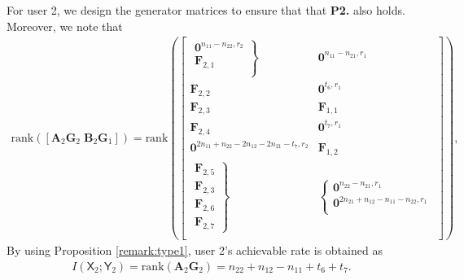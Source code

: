 \documentclass[12pt, draftclsnofoot, onecolumn]{IEEEtran}
\newcommand{\msf}[1]{\mathsf{#1}}
\theoremstyle{definition}
\begin{document}
For user 2, we design the generator matrices to ensure that that {\bf P2.} also holds. Moreover, we note that
\begin{align}
\text{rank}([\boldsymbol{A}_2\boldsymbol{G}_2 \; \boldsymbol{B}_2\boldsymbol{G}_1]) =\text{rank}\left(
\begin{bmatrix}
\left. {\begin{array}{*{20}{c}}
\boldsymbol{0}^{n_{11}-n_{22},r_2} \\
\boldsymbol{F}_{2,1} \\
\end{array}} \right\} & \boldsymbol{0}^{n_{11}-n_{21},r_1} \\
\boldsymbol{F}_{2,2} & \boldsymbol{0}^{t_6,r_1} \\
\boldsymbol{F}_{2,3} & \boldsymbol{F}_{1,1}\\
\boldsymbol{F}_{2,4} & \boldsymbol{0}^{t_7,r_1} \\
\boldsymbol{0}^{2n_{11}+n_{22}-2n_{12}-2n_{21}-t_7,r_2} & \boldsymbol{F}_{1,2} \\
\left. {\begin{array}{*{20}{c}}
\boldsymbol{F}_{2,5} \\
\boldsymbol{F}_{2,3} \\
\boldsymbol{F}_{2,6} \\
\boldsymbol{F}_{2,7}
\end{array}} \right\} & \left\{ {\begin{array}{*{20}{c}}
\boldsymbol{0}^{n_{22}-n_{21},r_1}\\
\boldsymbol{0}^{2n_{21}+n_{12}-n_{11}-n_{22},r_1}\\
\end{array}} \right.\\
\end{bmatrix}
\right),
\end{align}
By using Proposition \ref{remark:type1}, user 2's achievable rate is obtained as
\begin{align}
I(\msf{X}_2;\msf{Y}_2)= \text{rank}(\boldsymbol{A}_2\boldsymbol{G}_2) =  n_{22}+n_{12}-n_{11}+t_6+t_7.
\end{align}














\end{document}
